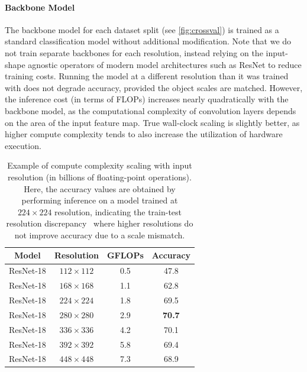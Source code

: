 \paragraph{Backbone Model}
The backbone model for each dataset split (see \autoref{fig:crossval}) is trained as a standard classification model without additional modification.
Note that we do not train separate backbones for each resolution, instead relying on the input-shape agnostic operators of modern model architectures such as ResNet to reduce training costs.
Running the model at a different resolution than it was trained with does not degrade accuracy, provided the object scales are matched.
However, the inference cost (in terms of FLOPs) increases nearly quadratically with the backbone model, as the computational complexity of convolution layers depends on the area of the input feature map.
True wall-clock scaling is slightly better, as higher compute complexity tends to also increase the utilization of hardware execution.
\begin{table}[]
    \centering
    \begin{tabular}{c|c|c|c}
       Model  & Resolution & GFLOPs & Accuracy  \\
    \hline
    ResNet-18 & $112\times112$ & 0.5 & 47.8\\ 
    ResNet-18 & $168\times168$ & 1.1 & 62.8\\ 
    ResNet-18 & $224\times224$ & 1.8 & 69.5\\ 
    ResNet-18 & $280\times280$ & 2.9 & \textbf{70.7}\\ 
    ResNet-18 & $336\times336$ & 4.2 & 70.1\\ 
    ResNet-18 & $392\times392$ & 5.8 & 69.4\\ 
    ResNet-18 & $448\times448$ & 7.3 & 68.9\\ 
    \end{tabular}
    \caption{Example of compute complexity scaling with input resolution (in billions of floating-point operations). Here, the accuracy values are obtained by performing inference on a model trained at $224\times224$ resolution, indicating the train-test resolution discrepancy~\cite{touvron2019fixing} where higher resolutions do not improve accuracy due to a scale mismatch. }
    \label{tab:complexity_scaling}
\end{table}

